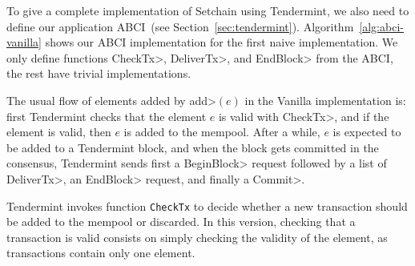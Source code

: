 %

To give a complete implementation of Setchain using Tendermint, we also need to
define our application ABCI~(see Section~\ref{sec:tendermint}).
%
%
Algorithm~\ref{alg:abci-vanilla} shows our ABCI implementation for the first
naive implementation.
%
We only define functions \<CheckTx>, \<DeliverTx>, and
\<EndBlock> from the ABCI, the rest have trivial implementations.
%



The usual flow of elements added by \<add>\((e)\) in the Vanilla implementation
is: first Tendermint checks that the element \(e\) is valid with \<CheckTx>, and if the
element is valid, then \(e\) is added to the mempool.
%
After a while, $e$ is expected to be added to a Tendermint block, and when the
block gets committed in the consensus, Tendermint sends first a \<BeginBlock>
request followed by a list of \<DeliverTx>, an \<EndBlock> request, and finally a
\<Commit>.
%

Tendermint invokes function \texttt{CheckTx} to decide
whether a new transaction should be added to the mempool or discarded.
%
In this version, checking that a transaction is valid consists on simply
checking the validity of the element, as transactions contain only one
element.
%
%
%

%

